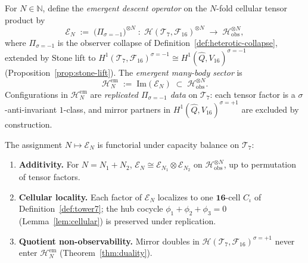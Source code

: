 \begin{definition}\label{def:emergent-descent}
For $N\in\mathbb{N}$, define the \emph{emergent descent operator} on the
$N$-fold cellular tensor product by
\begin{equation}\label{eq:emergent-descent}
  \mathcal{E}_N
  \;:=\;
  \bigl(\Pi_{\sigma=-1}\bigr)^{\otimes N}
  \;:\;
  \mathcal{H}(\mathcal{T}_7,\mathcal{F}_{16})^{\otimes N}
  \;\longrightarrow\;
  \mathcal{H}_{\mathrm{obs}}^{\otimes N},
\end{equation}
where $\Pi_{\sigma=-1}$ is the observer collapse of
Definition~\ref{def:heterotic-collapse}, extended by Stone lift to
$H^1(\mathcal{T}_7,\mathcal{F}_{16})^{\sigma=-1}\cong
H^1(\hat Q,V_{16})^{\sigma=-1}$ (Proposition~\ref{prop:stone-lift}). The
\emph{emergent many-body sector} is
\begin{equation}\label{eq:emergent-sector}
  \mathcal{H}_N^{\mathrm{em}}
  \;:=\;
  \mathrm{Im}(\mathcal{E}_N)
  \;\subset\;
  \mathcal{H}_{\mathrm{obs}}^{\otimes N}.
\end{equation}
Configurations in $\mathcal{H}_N^{\mathrm{em}}$ are \emph{replicated
$\Pi_{\sigma=-1}$ data} on $\mathcal{T}_7$: each tensor factor is a
$\sigma$-anti-invariant $1$-class, and mirror partners in
$H^1(\hat Q,V_{16})^{\sigma=+1}$ are excluded by construction.
\end{definition}

\begin{proposition}\label{prop:emergent-functor}
The assignment $N\mapsto\mathcal{E}_N$ is functorial under capacity balance
on $\mathcal{T}_7$:
\begin{enumerate}[label=(\roman*),leftmargin=*]
  \item \textbf{Additivity.} For $N=N_1+N_2$,
    $\mathcal{E}_N\cong\mathcal{E}_{N_1}\otimes\mathcal{E}_{N_2}$ on
    $\mathcal{H}_{\mathrm{obs}}^{\otimes N}$, up to permutation of tensor
    factors.
  \item \textbf{Cellular locality.} Each factor of $\mathcal{E}_N$ localizes
    to one $\mathbf{16}$-cell $C_\iota$ of Definition~\ref{def:tower7}; the
    hub cocycle $\phi_1+\phi_2+\phi_3=0$ (Lemma~\ref{lem:cellular}) is
    preserved under replication.
  \item \textbf{Quotient non-observability.} Mirror doubles in
    $\mathcal{H}(\mathcal{T}_7,\mathcal{F}_{16})^{\sigma=+1}$ never enter
    $\mathcal{H}_N^{\mathrm{em}}$ (Theorem~\ref{thm:duality}).
\end{enumerate}
\end{proposition}

